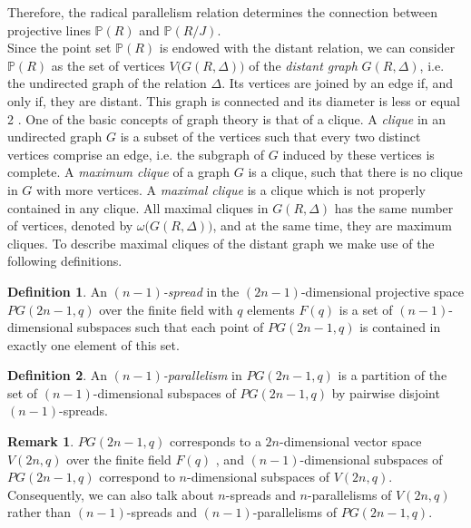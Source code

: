 \documentclass[12pt,a4paper]{article}
\theoremstyle{definition}
\newtheorem{defn}{Definition}
\newtheorem{rem}{Remark}
\begin{document}
Therefore, the radical parallelism relation determines the connection between projective lines $\mathbb{P}(R)$ and $\mathbb{P}(R/J)$. \newline\\
Since the point set $\mathbb{P}(R)$ is endowed with the distant relation, we can consider $\mathbb{P}(R)$ as the set of vertices $V\bigl(G(R, \Delta)\bigr)$  of the {\sl distant graph} $G(R, \Delta)$, i.e. the undirected graph of the relation $\Delta$. 
Its vertices are joined by an edge if, and only if, they are distant. This graph is connected
and its diameter is less or equal 2 \cite[1.4.2. Proposition]{chain.g}.\newline
One of the basic concepts of graph theory is that of a clique. A {\sl clique} in an undirected graph $G$ is a subset of the vertices such that every two distinct vertices comprise an edge, i.e. the subgraph of $G$ induced by these vertices is complete. A {\sl maximum clique} of a graph $G$ is a clique, such that there is no clique  in $G$ with more vertices. A {\sl maximal clique} is a clique which is not properly contained in any
clique. All maximal cliques in $G(R, \Delta)$ has the same number of vertices, denoted by $\omega\bigl(G(R, \Delta)\bigr)$, and at the same time, they are maximum cliques.\newline 
To describe maximal cliques of the distant graph we make use of the following definitions. 

\begin{defn}
An {\sl $(n-1)$-spread} in the $(2n-1)$-dimensional projective space $PG(2n-1, q)$ over the finite field  with $q$ elements $F(q)$  is a set of $(n-1)$-dimensional subspaces such that each point of $PG(2n-1, q)$ is contained in exactly one element of this set.
\end{defn}

\begin{defn}
An {\sl $(n-1)$-parallelism} in $PG(2n-1, q)$ is a partition of the set of $(n-1)$-dimensional subspaces of $PG(2n-1, q)$ by pairwise disjoint $(n-1)$-spreads.
\end{defn}

\begin{rem}\label{V-PG}
$PG(2n-1, q)$ corresponds to a $2n$-dimensional vector space $V(2n, q)$ over the finite field $F(q)$ , and  $(n-1)$-dimensional subspaces of $PG(2n-1, q)$ correspond to $n$-dimensional subspaces of $V(2n, q)$. Consequently, we can also talk about $n$-spreads and $n$-parallelisms of $V(2n,q)$ rather than $(n-1)$-spreads and $(n-1)$-parallelisms of $PG(2n-1,q)$.
\end{rem}
\end{document}
